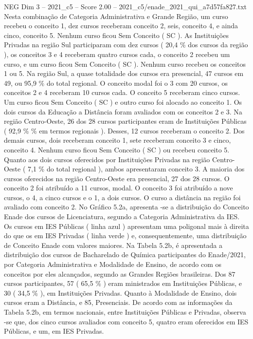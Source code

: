 \begin{textsample}{NEG Dim 3 – 2021\_c5 – Score 2.00 – 2021\_c5/enade\_2021\_qui\_a7d57fa827.txt}
Nesta combinação de Categoria Administrativa e Grande Região, um curso recebeu o conceito 1, dez cursos receberam conceito 2, seis, conceito 4, e ainda cinco, conceito 5.
Nenhum curso ficou Sem Conceito ( SC ).
As Instituições Privadas na região Sul participaram com dez cursos ( 20,4 \% dos cursos da região ), os conceitos 3 e 4 receberam quatro cursos cada, o conceito 2 recebeu um curso, e um curso ficou Sem Conceito ( SC ).
Nenhum curso recebeu os conceitos 1 ou 5.
Na região Sul, a quase totalidade dos cursos era presencial, 47 cursos em 49, ou 95,9 \% do total regional.
O conceito modal foi o 3 com 20 cursos, os conceitos 2 e 4 receberam 10 cursos cada.
O conceito 5 receberam cinco cursos.
Um curso ficou Sem Conceito ( SC ) e outro curso foi alocado ao conceito 1.
Os dois cursos da Educação a Distância foram avaliados com os conceitos 2 e 3.
Na região Centro-Oeste, 26 dos 28 cursos participantes eram de Instituições Públicas ( 92,9 \% \% em termos regionais ).
Desses, 12 cursos receberam o conceito 2.
Dos demais cursos, dois receberam conceito 1, sete receberam conceito 3 e cinco, conceito 4.
Nenhum curso ficou Sem Conceito ( SC ) ou recebeu conceito 5.
Quanto aos dois cursos oferecidos por Instituições Privadas na região Centro-Oeste ( 7,1 \% do total regional ), ambos apresentaram conceito 3.
A maioria dos cursos oferecidos na região Centro-Oeste era presencial, 27 dos 28 cursos.
O conceito 2 foi atribuído a 11 cursos, modal.
O conceito 3 foi atribuído a nove cursos, o 4, a cinco cursos e o 1, a dois cursos.
O curso a distância na região foi avaliado com conceito 2.
No Gráfico 5.2a, apresenta -se a distribuição do Conceito Enade dos cursos de Licenciatura, segundo a Categoria Administrativa da IES.
Os cursos em IES Públicas ( linha azul ) apresentam uma poligonal mais à direita do que os em IES Privadas ( linha verde ) e, consequentemente, uma distribuição de Conceito Enade com valores maiores.
Na Tabela 5.2b, é apresentada a distribuição dos cursos de Bacharelado de Química participantes do Enade/2021, por Categoria Administrativa e Modalidade de Ensino, de acordo com os conceitos por eles alcançados, segundo as Grandes Regiões brasileiras.
Dos 87 cursos participantes, 57 ( 65,5 \% ) eram ministrados em Instituições Públicas, e 30 ( 34,5 \% ), em Instituições Privadas.
Quanto à Modalidade de Ensino, dois cursos eram a Distância, e 85, Presenciais.
De acordo com as informações da Tabela 5.2b, em termos nacionais, entre Instituições Públicas e Privadas, observa -se que, dos cinco cursos avaliados com conceito 5, quatro eram oferecidos em IES Públicas, e um, em IES Privadas.

\end{textsample}
